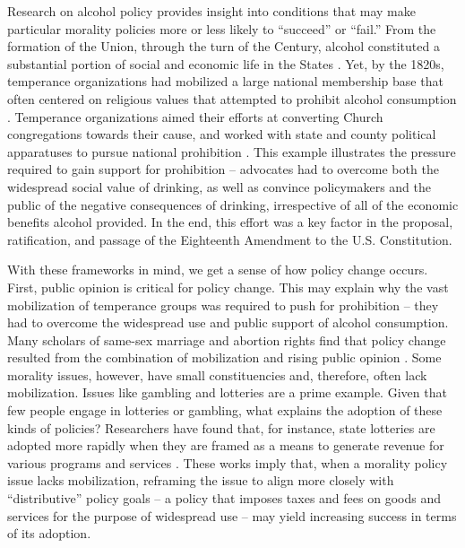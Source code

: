 Research on alcohol policy provides insight into conditions that may make particular morality policies more or less likely to ``succeed'' or ``fail.'' From the formation of the Union, through the turn of the  Century, alcohol constituted a substantial portion of social and economic life in the States \citep{aaron_and_musto_1981,andrews_and_seguin_2015}. Yet, by the 1820s, temperance organizations had mobilized a large national membership base that often centered on religious values that attempted to prohibit alcohol consumption \citep{gusfield_1963,skocpol_et_al_2000,andrews_and_seguin_2015,young_2002,beisel_1997}. Temperance organizations aimed their efforts at converting Church congregations towards their cause, and worked with state and county political apparatuses to pursue national prohibition \citep{blocker_1989}. This example illustrates the pressure required to gain support for prohibition -- advocates had to overcome both the widespread social value of drinking, as well as convince policymakers  and the public of the negative consequences of drinking, irrespective of all of the economic benefits alcohol provided. In the end, this effort was a key factor in the proposal, ratification, and passage of the Eighteenth Amendment to the U.S. Constitution. 


With these frameworks in mind, we get a sense of how policy change occurs. First, public opinion is critical for policy change. This may explain why the vast mobilization of temperance groups was required to push for prohibition -- they had to overcome the widespread use and public support of alcohol consumption. Many scholars of same-sex marriage and abortion rights find that policy change resulted from the combination of mobilization and rising public opinion \citep{rohlinger_2002,zucker_1999,carmines_and_woods_2002,halfmann_2011,schnabel_and_sevell_2017}. Some morality issues, however, have small constituencies and, therefore, often lack mobilization. Issues like gambling and lotteries are a prime example. Given that few people engage in lotteries or gambling, what explains the adoption of these kinds of policies? Researchers have found that, for instance, state lotteries are adopted more rapidly when they are framed as a means to generate revenue for various programs and services \citep{mikesell_and_zorn_1986,berry_and_berry_1990}. These works imply that, when a morality policy issue lacks mobilization, reframing the issue to align more closely with ``distributive'' policy goals -- a policy that imposes taxes and fees on goods and services for the purpose of widespread use -- may yield increasing success in terms of its adoption.




